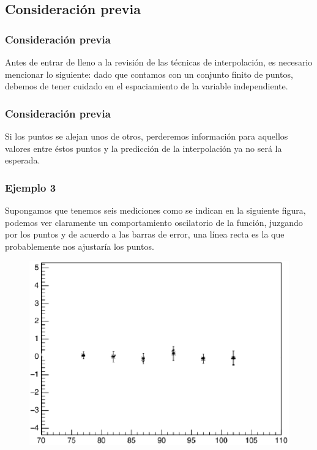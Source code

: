 \subsection{Consideración previa}
\begin{frame}
\frametitle{Consideración previa}
Antes de entrar de lleno a la revisión de las técnicas de interpolación, es necesario mencionar lo siguiente: dado que contamos con un conjunto finito de puntos, debemos de tener cuidado en el espaciamiento de la variable independiente.
\end{frame}
\begin{frame}
\frametitle{Consideración previa}
Si los puntos se alejan unos de otros, perderemos información para aquellos valores entre éstos puntos y la predicción de la interpolación ya no será la esperada.
\end{frame}
\begin{frame}
\frametitle{Ejemplo 3}
\fontsize{12}{12}\selectfont
Supongamos que tenemos seis mediciones como se indican en la siguiente figura, podemos ver claramente un comportamiento oscilatorio de la función, juzgando por los puntos y de acuerdo a las barras de error, una línea recta es la que probablemente nos ajustaría los puntos.
\begin{figure}
	\centering
	\includegraphics[scale=0.35]{Imagenes/figura01-1.eps} 
\end{figure}
\end{frame}
